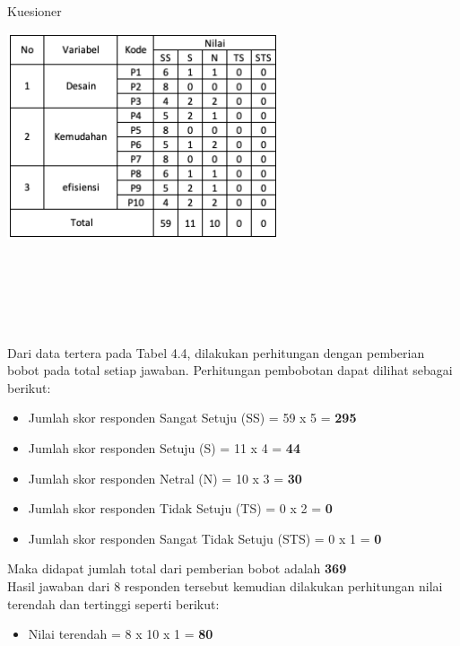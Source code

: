 \begin{flushleft}
\begin{justify}
        \begin{table}[ht]
            \centering
            \caption{Kuesioner}
            \includegraphics[width=8cm]{images/bab 4/hitungan.png}\\
            \end{table}
            \newline \noindent \\\\\\\\
            \vspace{5cm}
            \noindent \\Dari data tertera pada Tabel 4.4, dilakukan perhitungan dengan pemberian bobot pada total setiap jawaban.
            Perhitungan pembobotan dapat dilihat sebagai berikut:
            \begin{itemize}
                \item Jumlah skor responden Sangat Setuju (SS) = 59 x 5 = \textbf{295}
                \item Jumlah skor responden Setuju (S)  = 11 x 4 = \textbf{44}
                \item Jumlah skor responden Netral (N)  = 10 x 3 = \textbf{30}
                \item Jumlah skor responden Tidak Setuju (TS)  = 0 x 2 = \textbf{0}
                \item Jumlah skor responden Sangat Tidak Setuju (STS)  = 0 x 1 = \textbf{0}
            \end{itemize}
            Maka didapat jumlah total dari pemberian bobot adalah \textbf{369}\\
            Hasil jawaban dari 8 responden tersebut kemudian dilakukan perhitungan nilai terendah dan tertinggi seperti berikut:
            \begin{itemize}
                \item Nilai terendah = 8 x 10 x 1 = \textbf{80}

\end{itemize}
\end{justify}
\end{flushleft}
